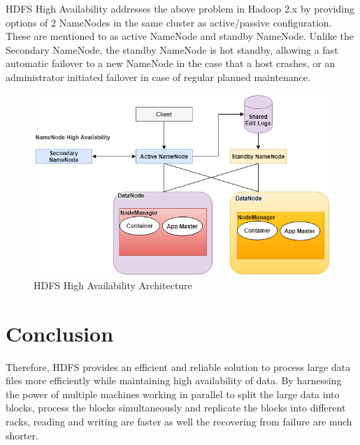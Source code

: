 HDFS High Availability addresses the above problem in Hadoop 2.x by providing
options of 2 NameNodes in the same cluster as active/passive configuration.
These are mentioned to as active NameNode and standby NameNode.  
Unlike the Secondary NameNode, the standby NameNode is hot standby, 
allowing a fast automatic failover to a new NameNode in 
the case that a host crashes, or an administrator initiated failover
in case of regular planned maintenance. 


\begin{figure}[!ht]
  \centering
\centering\includegraphics[width=\columnwidth]{images/HDFS_HA.png}
  \caption{HDFS High Availability Architecture}\label{f:hdfs-ha}
\end{figure}


\section{Conclusion}

Therefore, HDFS provides an efficient and reliable solution to process
large data files more efficiently while maintaining high availability
of data. By harnessing the power of multiple machines working in
parallel to split the large data into blocks, process the blocks
simultaneously and replicate the blocks into different racks, reading
and writing are faster as well the recovering from failure are much
shorter.


 